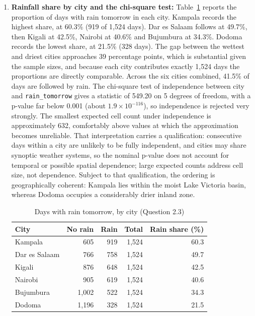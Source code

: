 \documentclass[conference]{IEEEtran}
\begin{document}
\begin{enumerate}
    \item \textbf{Rainfall share by city and the chi-square test:} Table~\ref{tab:rainshare} reports the proportion of days with rain tomorrow in each city. Kampala records the highest share, at 60.3\% (919 of 1{,}524 days). Dar es Salaam follows at 49.7\%, then Kigali at 42.5\%, Nairobi at 40.6\% and Bujumbura at 34.3\%. Dodoma records the lowest share, at 21.5\% (328 days). The gap between the wettest and driest cities approaches 39 percentage points, which is substantial given the sample sizes, and because each city contributes exactly 1{,}524 days the proportions are directly comparable. Across the six cities combined, 41.5\% of days are followed by rain. The chi-square test of independence between city and \texttt{rain\_tomorrow} gives a statistic of 549.20 on 5 degrees of freedom, with a p-value far below 0.001 (about $1.9 \times 10^{-116}$), so independence is rejected very strongly. The smallest expected cell count under independence is approximately 632, comfortably above values at which the approximation becomes unreliable. That interpretation carries a qualification: consecutive days within a city are unlikely to be fully independent, and cities may share synoptic weather systems, so the nominal p-value does not account for temporal or possible spatial dependence; large expected counts address cell size, not dependence. Subject to that qualification, the ordering is geographically coherent: Kampala lies within the moist Lake Victoria basin, whereas Dodoma occupies a considerably drier inland zone.

    \begin{table}[h!]
        \centering
        \footnotesize
        \begin{tabular}{lrrrr}
            \toprule
            City & No rain & Rain & Total & Rain share (\%) \\
            \midrule
            Kampala & 605 & 919 & 1{,}524 & 60.3 \\
            Dar es Salaam & 766 & 758 & 1{,}524 & 49.7 \\
            Kigali & 876 & 648 & 1{,}524 & 42.5 \\
            Nairobi & 905 & 619 & 1{,}524 & 40.6 \\
            Bujumbura & 1{,}002 & 522 & 1{,}524 & 34.3 \\
            Dodoma & 1{,}196 & 328 & 1{,}524 & 21.5 \\
            \bottomrule
        \end{tabular}
        \caption{Days with rain tomorrow, by city (Question 2.3)}
        \label{tab:rainshare}
    \end{table}


\end{enumerate}
\end{document}
